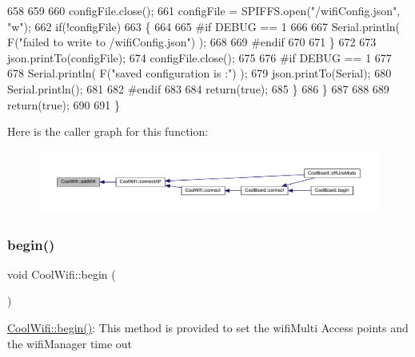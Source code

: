 \begin{DoxyCode}
658             
659 
660             configFile.close();
661             configFile = SPIFFS.open(\textcolor{stringliteral}{"/wifiConfig.json"}, \textcolor{stringliteral}{"w"});
662             \textcolor{keywordflow}{if}(!configFile)
663             \{
664             
665 \textcolor{preprocessor}{            #if DEBUG == 1 }
666 
667                 Serial.println( F(\textcolor{stringliteral}{"failed to write to /wifiConfig.json"}) );
668             
669 \textcolor{preprocessor}{            #endif}
670 
671             \}
672             
673             json.printTo(configFile);
674             configFile.close();
675 
676 \textcolor{preprocessor}{        #if DEBUG == 1 }
677 
678             Serial.println( F(\textcolor{stringliteral}{"saved configuration is :"}) );
679             json.printTo(Serial);
680             Serial.println();
681         
682 \textcolor{preprocessor}{        #endif}
683 
684             \textcolor{keywordflow}{return}(\textcolor{keyword}{true}); 
685         \}
686     \}   
687 
688     
689     \textcolor{keywordflow}{return}(\textcolor{keyword}{true});
690     
691 \}
\end{DoxyCode}
Here is the caller graph for this function\+:\nopagebreak
\begin{figure}[H]
\begin{center}
\leavevmode
\includegraphics[width=350pt]{d7/d29/class_cool_wifi_a914d7a1df14dd6b75345fb614c34e9d6_icgraph}
\end{center}
\end{figure}
\mbox{\label{class_cool_wifi_a46942fed90e475112cc10b78a32e7aaa}} 
\subsubsection{\texorpdfstring{begin()}{begin()}}
{\footnotesize\ttfamily void Cool\+Wifi\+::begin (\begin{DoxyParamCaption}{ }\end{DoxyParamCaption})}

\hyperlink{class_cool_wifi_a46942fed90e475112cc10b78a32e7aaa}{Cool\+Wifi\+::begin()}\+: This method is provided to set the wifi\+Multi Access points and the wifi\+Manager time out 

